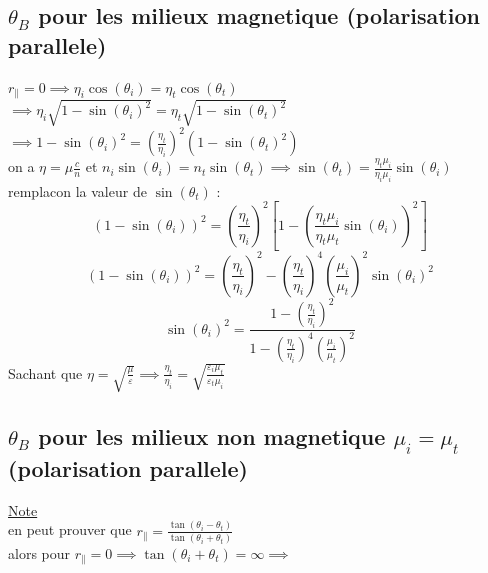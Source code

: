 \documentclass[12pt]{book}
\begin{document}
            \subsection{$\theta_B$ pour les milieux magnetique (polarisation parallele) }
                $r_\parallel =0 \implies \eta_i\cos(\theta_i)=\eta_t\cos(\theta_t)$ \\
                $\implies \eta_i\sqrt{1-\sin(\theta_i)^2} = \eta_t\sqrt{1-\sin(\theta_t)^2}$ \\
                $\implies 1-\sin(\theta_i)^2 = (\frac{\eta_t}{\eta_i})^2(1-\sin(\theta_t)^2)$ \\
                on a $\eta = \mu\frac{c}{n}$ et $n_i \sin(\theta_i) = n_t\sin(\theta_t) \implies \sin(\theta_t) =\frac{\eta_t\mu_i}{\eta_i\mu_i}\sin(\theta_i)$\\
                remplacon la valeur de $\sin(\theta_t)$ : \\
                \[ (1-\sin(\theta_i))^2 = (\frac{\eta_t}{\eta_i})^2 \left[ 1-(\frac{\eta_t\mu_i}{\eta_t\mu_t}\sin(\theta_i))^2 \right] \]
                \[ (1-\sin(\theta_i))^2 = (\frac{\eta_t}{\eta_i})^2 - (\frac{\eta_t}{\eta_i})^4(\frac{\mu_i}{\mu_t})^2\sin(\theta_i)^2 \]
                \[ \sin(\theta_i)^2 = \frac{ 1- (\frac{\eta_t}{\eta_i})^2 }{ 1- (\frac{\eta_t}{\eta_i})^4(\frac{\mu_i}{\mu_t})^2 } \]
                Sachant que $\eta = \sqrt{\frac{\mu}{\varepsilon}} \implies \frac{\eta_t}{\eta_i}=\sqrt{\frac{\varepsilon_i\mu_t}{\varepsilon_t\mu_i}} $ \\
                \begin{center}
                \end{center}
            \subsection{$\theta_B$ pour les milieux non magnetique $\mu_i = \mu_t$ (polarisation parallele) }
                \begin{center}
                \end{center}
            \underline{Note}\\
            en peut prouver que $r_\parallel = \frac{\tan(\theta_i - \theta_t)}{\tan(\theta_i + \theta_t)}$\\
            alors pour $r_\parallel =0 \implies \tan(\theta_i + \theta_t) = \infty \implies$ 
\end{document}
